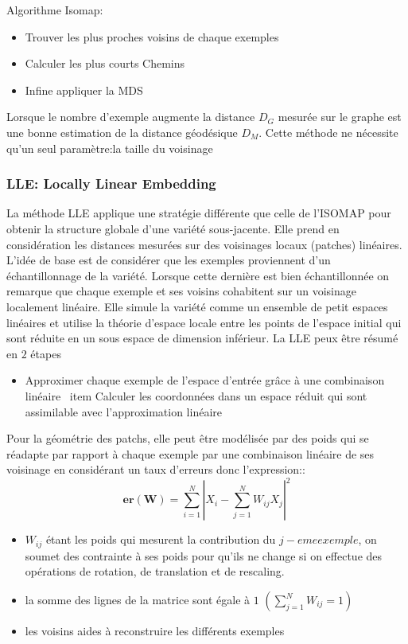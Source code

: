 \documentclass[twoside,twocolumn]{article}
\begin{document}
Algorithme Isomap:
\begin{itemize}
\item Trouver les plus proches voisins de chaque exemples
\item Calculer les plus courts Chemins
\item Infine appliquer la MDS 
\end{itemize}
Lorsque le nombre d’exemple augmente la distance $D_G$ mesurée sur le graphe est une bonne estimation de la distance géodésique $D_M$. Cette méthode ne nécessite qu’un seul paramètre:la taille du voisinage

\subsubsection{LLE: Locally Linear Embedding}

La méthode LLE applique une stratégie différente que celle de l’ISOMAP pour obtenir la structure globale d’une variété sous-jacente. Elle prend en considération les distances mesurées sur des voisinages locaux (patches) linéaires. L’idée de base est de considérer que les exemples proviennent d’un échantillonnage de la variété. Lorsque cette dernière est bien échantillonnée on remarque que chaque exemple et ses voisins cohabitent sur un voisinage localement linéaire.\cite{Arias06}  Elle simule la variété comme un ensemble de petit espaces linéaires et utilise la théorie d’espace locale entre les points de l’espace initial qui sont réduite en un sous espace de dimension inférieur. La LLE peux être résumé en $2$ étapes
\begin{itemize}
\item Approximer chaque exemple de l’espace d’entrée grâce à une  combinaison linéaire
\ item Calculer les coordonnées dans un espace réduit qui sont assimilable avec l’approximation linéaire
\end{itemize}
Pour la géométrie des patchs, elle peut être modélisée par des poids qui se réadapte par rapport à chaque exemple par une combinaison linéaire de ses voisinage en considérant un taux d’erreurs donc l’expression:\cite{Arias06}:
\[ \mathbf {er(W)}= \sum_{i=1}^{N}| X_i - \sum_{j=1}^{N} W_{ij}X_j|^2\]

\begin{itemize}
\item $W_{ij}$ étant les poids qui mesurent la contribution du $j-eme exemple$, on soumet des contrainte à ses poids pour qu’ils ne change si on effectue des opérations de rotation, de translation et de rescaling.  
\item la somme des lignes de la matrice sont égale à $1$ \quad  $( \sum_{j=1}^{N} W_{ij}=1)$
\item  les voisins aides à reconstruire les différents exemples 
\end{itemize}
\end{document}
